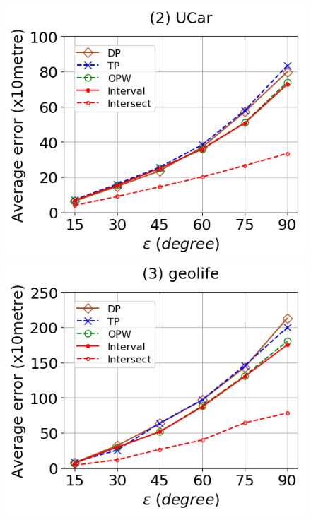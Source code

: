 \begin{figure}[tb!]
	\centering
	\includegraphics[scale = 0.320]{Figures/Exp-query-DAD-error-epsilon-service.png}\hspace{3ex}
	\includegraphics[scale = 0.320]{Figures/Exp-query-DAD-error-epsilon-geolife.png}\hspace{3ex}

\end{figure}
